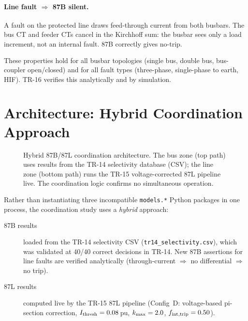 \documentclass[11pt, a4paper]{article}
\begin{document}
\paragraph{Line fault $\Rightarrow$ 87B silent.}
A fault on the protected line draws feed-through current from both busbars.
The bus CT and feeder CTs cancel in the Kirchhoff sum: the busbar sees only
a load increment, not an internal fault.  87B correctly gives no-trip.

These properties hold for all busbar topologies (single bus, double bus,
bus-coupler open/closed) and for all fault types (three-phase, single-phase
to earth, HIF).  TR-16 verifies this analytically and by simulation.


\section{Architecture: Hybrid Coordination Approach}
\label{sec:architecture}

\begin{figure}[h]
  \centering
  
  \caption{Hybrid 87B/87L coordination architecture.  The bus zone (top path)
           uses results from the TR-14 selectivity database (CSV); the line
           zone (bottom path) runs the TR-15 voltage-corrected 87L pipeline
           live.  The coordination logic confirms no simultaneous operation.}
  \label{fig:arch}
\end{figure}

Rather than instantiating three incompatible \texttt{models.*} Python
packages in one process, the coordination study uses a \emph{hybrid}
approach:

\begin{description}
  \item[87B results] loaded from the TR-14 selectivity CSV
        (\texttt{tr14\_selectivity.csv}), which was validated at 40/40
        correct decisions in TR-14.  New 87B assertions for line faults are
        verified analytically (through-current $\Rightarrow$ no differential
        $\Rightarrow$ no trip).

  \item[87L results] computed live by the TR-15 87L pipeline (Config~D:
        voltage-based pi-section correction, $I_{\rm thresh}=0.08$\,pu,
        $k_{\rm max}=2.0$, $f_{\rm int,trip}=0.50$).
\end{description}
\end{document}
